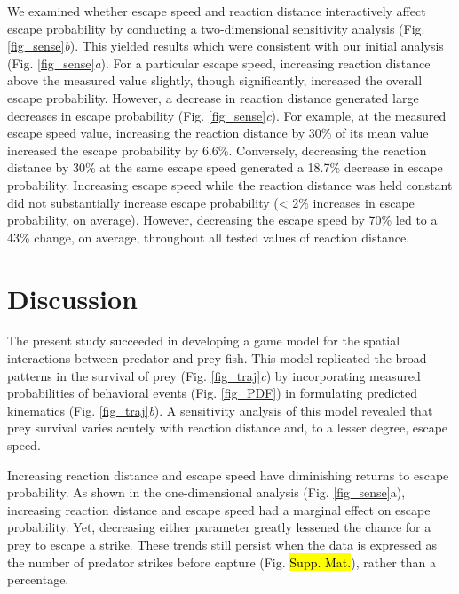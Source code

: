 \documentclass[]{rsos}%
\begin{document}
We examined whether escape speed and reaction distance interactively affect escape probability by conducting a two-dimensional sensitivity analysis (Fig. \ref{fig_sense}\textit{b}).
This yielded results which were consistent with our initial analysis (Fig. \ref{fig_sense}\textit{a}). 
For a particular escape speed, increasing reaction distance above the measured value slightly, though significantly, increased the overall escape probability. 
However, a decrease in reaction distance generated large decreases in escape probability (Fig. \ref{fig_sense}\textit{c}). 
For example, at the measured escape speed value, increasing the reaction distance by 30\% of its mean value increased the escape probability by 6.6\%. 
Conversely, decreasing the reaction distance by 30\% at the same escape speed generated a 18.7\% decrease in escape probability.
Increasing escape speed while the reaction distance was held constant did not substantially increase escape probability (< 2\% increases in escape probability, on average).
However, decreasing the escape speed by 70\% led to a 43\% change, on average, throughout all tested values of reaction distance.



\section{Discussion} %

The present study succeeded in developing a game model for the spatial interactions between predator and prey fish. 
This model replicated the broad patterns in the survival of prey (Fig. \ref{fig_traj}\textit{c}) by incorporating measured probabilities of behavioral events (Fig. \ref{fig_PDF}) in formulating predicted kinematics (Fig. \ref{fig_traj}\textit{b}).
A sensitivity analysis of this model revealed that prey survival varies acutely with reaction distance and, to a lesser degree, escape speed.

Increasing reaction distance and escape speed have diminishing returns to escape probability.
As shown in the one-dimensional analysis (Fig. \ref{fig_sense}a),
increasing reaction distance and escape speed had a marginal effect on escape probability. 
Yet, decreasing either parameter greatly lessened the chance for a prey to escape a strike.
These trends still persist when the data is expressed as the number of predator strikes before capture (Fig. \hl{Supp. Mat.}), rather than a percentage.
\end{document}
